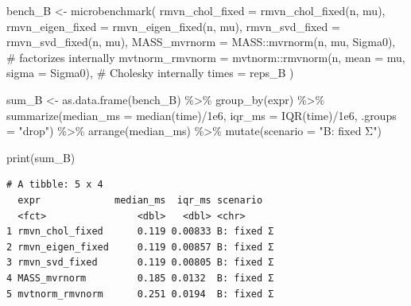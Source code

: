 \documentclass[
  letterpaper,
  DIV=11,
  numbers=noendperiod]{scrreprt}
\newenvironment{Shaded}{\begin{snugshade}}{\end{snugshade}}
\newcommand{\AttributeTok}[1]{\textcolor[rgb]{0.40,0.45,0.13}{#1}}
\newcommand{\CommentTok}[1]{\textcolor[rgb]{0.37,0.37,0.37}{#1}}
\newcommand{\FloatTok}[1]{\textcolor[rgb]{0.68,0.00,0.00}{#1}}
\newcommand{\FunctionTok}[1]{\textcolor[rgb]{0.28,0.35,0.67}{#1}}
\newcommand{\NormalTok}[1]{\textcolor[rgb]{0.00,0.23,0.31}{#1}}
\newcommand{\OtherTok}[1]{\textcolor[rgb]{0.00,0.23,0.31}{#1}}
\newcommand{\SpecialCharTok}[1]{\textcolor[rgb]{0.37,0.37,0.37}{#1}}
\newcommand{\StringTok}[1]{\textcolor[rgb]{0.13,0.47,0.30}{#1}}
\begin{document}
\begin{tcolorbox}
\begin{Shaded}
\begin{Highlighting}[]
\NormalTok{bench\_B }\OtherTok{\textless{}{-}} \FunctionTok{microbenchmark}\NormalTok{(}
  \AttributeTok{rmvn\_chol\_fixed   =} \FunctionTok{rmvn\_chol\_fixed}\NormalTok{(n, mu),}
  \AttributeTok{rmvn\_eigen\_fixed  =} \FunctionTok{rmvn\_eigen\_fixed}\NormalTok{(n, mu),}
  \AttributeTok{rmvn\_svd\_fixed    =} \FunctionTok{rmvn\_svd\_fixed}\NormalTok{(n, mu),}
  \AttributeTok{MASS\_mvrnorm      =}\NormalTok{ MASS}\SpecialCharTok{::}\FunctionTok{mvrnorm}\NormalTok{(n, mu, Sigma0),                   }\CommentTok{\# factorizes internally}
  \AttributeTok{mvtnorm\_rmvnorm   =}\NormalTok{ mvtnorm}\SpecialCharTok{::}\FunctionTok{rmvnorm}\NormalTok{(n, }\AttributeTok{mean =}\NormalTok{ mu, }\AttributeTok{sigma =}\NormalTok{ Sigma0), }\CommentTok{\# Cholesky internally}
  \AttributeTok{times =}\NormalTok{ reps\_B}
\NormalTok{)}

\NormalTok{sum\_B }\OtherTok{\textless{}{-}} \FunctionTok{as.data.frame}\NormalTok{(bench\_B) }\SpecialCharTok{\%\textgreater{}\%}
  \FunctionTok{group\_by}\NormalTok{(expr) }\SpecialCharTok{\%\textgreater{}\%}
  \FunctionTok{summarize}\NormalTok{(}\AttributeTok{median\_ms =} \FunctionTok{median}\NormalTok{(time)}\SpecialCharTok{/}\FloatTok{1e6}\NormalTok{,}
            \AttributeTok{iqr\_ms    =} \FunctionTok{IQR}\NormalTok{(time)}\SpecialCharTok{/}\FloatTok{1e6}\NormalTok{,}
            \AttributeTok{.groups =} \StringTok{"drop"}\NormalTok{) }\SpecialCharTok{\%\textgreater{}\%}
  \FunctionTok{arrange}\NormalTok{(median\_ms) }\SpecialCharTok{\%\textgreater{}\%}
  \FunctionTok{mutate}\NormalTok{(}\AttributeTok{scenario =} \StringTok{"B: fixed Σ"}\NormalTok{)}

\FunctionTok{print}\NormalTok{(sum\_B)}
\end{Highlighting}
\end{Shaded}

\begin{verbatim}
# A tibble: 5 x 4
  expr             median_ms  iqr_ms scenario  
  <fct>                <dbl>   <dbl> <chr>     
1 rmvn_chol_fixed      0.119 0.00833 B: fixed Σ
2 rmvn_eigen_fixed     0.119 0.00857 B: fixed Σ
3 rmvn_svd_fixed       0.119 0.00805 B: fixed Σ
4 MASS_mvrnorm         0.185 0.0132  B: fixed Σ
5 mvtnorm_rmvnorm      0.251 0.0194  B: fixed Σ
\end{verbatim}


\end{tcolorbox}
\end{document}
